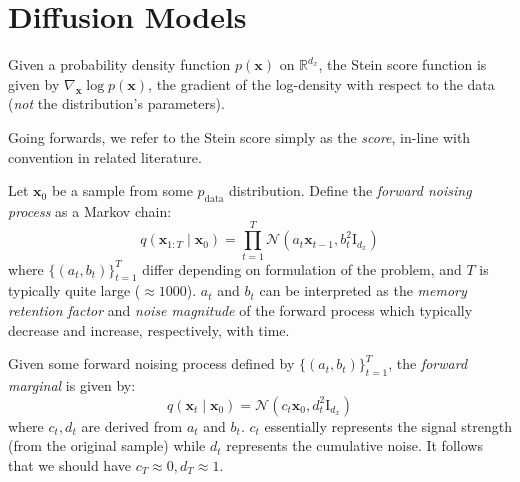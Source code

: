 \section{Diffusion Models}\label{sec:diffusion-models}

\begin{definition} \label{def:stein-score}
    Given a probability density function $p(\mathbf{x})$ on $\mathbb{R}^{d_x}$, the Stein score
    function is given by $\nabla_{\mathbf{x}} \log p(\mathbf{x})$, the gradient of the log-density
    with respect to the data (\emph{not} the distribution's parameters).
\end{definition}

Going forwards, we refer to the Stein score simply as the \emph{score}, in-line with convention in
related literature.

\begin{definition}
    Let $\mathbf{x}_0$ be a sample from some $p_{\text{data}}$ distribution. Define the
    \emph{forward noising process} as a Markov chain:
    \begin{equation*}
    q(\mathbf{x}_{1:T} \mid \mathbf{x}_0) = \prod_{t=1}^T \mathcal{N}\left(a_t \mathbf{x}_{t-1}, b_t^2\mathrm{I}_{d_x}\right) \label{eq:fwd}
    \end{equation*}
    where $\{(a_t, b_t)\}_{t=1}^T$ differ depending on formulation of the problem, and $T$ is
    typically quite large ($\approx 1000$). $a_t$ and $b_t$ can be interpreted as the
    \emph{memory retention factor} and \emph{noise magnitude} of the forward process which typically
    decrease and increase, respectively, with time.
\end{definition}

\begin{definition}
    Given some forward noising process defined by $\{(a_t, b_t)\}_{t=1}^T$, the
    \emph{forward marginal} is given by:
    $$
    q(\mathbf{x}_t \mid \mathbf{x}_0) = \mathcal{N}(c_t\mathbf{x}_0, d_t^2\mathrm{I}_{d_x})
    $$
    where $c_t, d_t$ are derived from $a_t$ and $b_t$. $c_t$ essentially represents the signal
    strength (from the original sample) while $d_t$ represents the cumulative noise. It follows that
    we should have $c_T \approx 0, d_T \approx 1$.
\end{definition}

